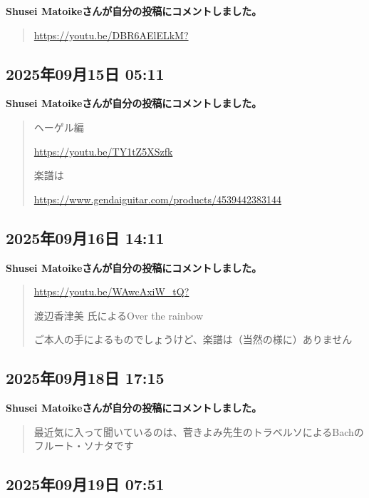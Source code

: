 \textbf{Shusei Matoikeさんが自分の投稿にコメントしました。}

\begin{quote}
\url{https://youtu.be/DBR6AElELkM?}
\end{quote}

\subsection*{2025年09月15日 05:11}

\textbf{Shusei Matoikeさんが自分の投稿にコメントしました。}

\begin{quote}
ヘーゲル編

\url{https://youtu.be/TY1tZ5XSzfk}

楽譜は

\url{https://www.gendaiguitar.com/products/4539442383144}
\end{quote}

\subsection*{2025年09月16日 14:11}

\textbf{Shusei Matoikeさんが自分の投稿にコメントしました。}

\begin{quote}
\url{https://youtu.be/WAwcAxiW_tQ?}

渡辺香津美 氏によるOver the rainbow

ご本人の手によるものでしょうけど、楽譜は（当然の様に）ありません
\end{quote}

\subsection*{2025年09月18日 17:15}

\textbf{Shusei Matoikeさんが自分の投稿にコメントしました。}

\begin{quote}
最近気に入って聞いているのは、菅きよみ先生のトラベルソによるBachのフルート・ソナタです
\end{quote}

\subsection*{2025年09月19日 07:51}

